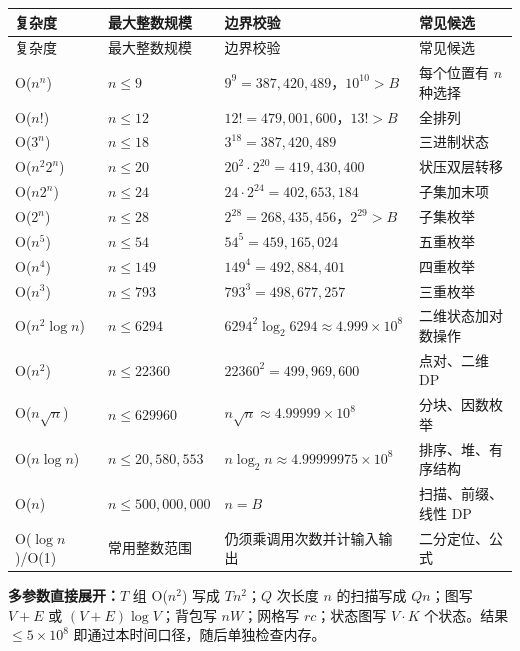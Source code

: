 \documentclass[a4paper,11pt]{article}
\begin{document}
\begingroup
\small
\begin{longtable}{L{3.1cm} C{3.2cm} L{5.6cm} L{4.0cm}}
\toprule
复杂度 & 最大整数规模 & 边界校验 & 常见候选 \\
\midrule
\endfirsthead
\toprule
复杂度 & 最大整数规模 & 边界校验 & 常见候选 \\
\midrule
\endhead
\endfoot
\bottomrule
\endlastfoot
O($n^n$) & $n\le9$ & $9^9=387{,}420{,}489$，$10^{10}>B$ & 每个位置有 $n$ 种选择 \\[1.2mm]
O($n!$) & $n\le12$ & $12!=479{,}001{,}600$，$13!>B$ & 全排列 \\[1.2mm]
O($3^n$) & $n\le18$ & $3^{18}=387{,}420{,}489$ & 三进制状态 \\[1.2mm]
O($n^2 2^n$) & $n\le20$ & $20^2\cdot2^{20}=419{,}430{,}400$ & 状压双层转移 \\[1.2mm]
O($n2^n$) & $n\le24$ & $24\cdot2^{24}=402{,}653{,}184$ & 子集加末项 \\[1.2mm]
O($2^n$) & $n\le28$ & $2^{28}=268{,}435{,}456$，$2^{29}>B$ & 子集枚举 \\[1.2mm]
O($n^5$) & $n\le54$ & $54^5=459{,}165{,}024$ & 五重枚举 \\[1.2mm]
O($n^4$) & $n\le149$ & $149^4=492{,}884{,}401$ & 四重枚举 \\[1.2mm]
O($n^3$) & $n\le793$ & $793^3=498{,}677{,}257$ & 三重枚举 \\[1.2mm]
O($n^2\log n$) & $n\le6294$ & $6294^2\log_2 6294\approx4.999\times10^8$ & 二维状态加对数操作 \\[1.2mm]
O($n^2$) & $n\le22360$ & $22360^2=499{,}969{,}600$ & 点对、二维 DP \\[1.2mm]
O($n\sqrt n$) & $n\le629960$ & $n\sqrt n\approx4.99999\times10^8$ & 分块、因数枚举 \\[1.2mm]
O($n\log n$) & $n\le20{,}580{,}553$ & $n\log_2n\approx4.99999975\times10^8$ & 排序、堆、有序结构 \\[1.2mm]
O($n$) & $n\le500{,}000{,}000$ & $n=B$ & 扫描、前缀、线性 DP \\[1.2mm]
O($\log n$)/O(1) & 常用整数范围 & 仍须乘调用次数并计输入输出 & 二分定位、公式 \\
\end{longtable}
\endgroup

\textbf{多参数直接展开：}$T$ 组 O($n^2$) 写成 $Tn^2$；$Q$ 次长度 $n$ 的扫描写成 $Qn$；图写 $V+E$ 或 $(V+E)\log V$；背包写 $nW$；网格写 $rc$；状态图写 $V\cdot K$ 个状态。结果 $\le5\times10^8$ 即通过本时间口径，随后单独检查内存。


\newpage
\end{document}
